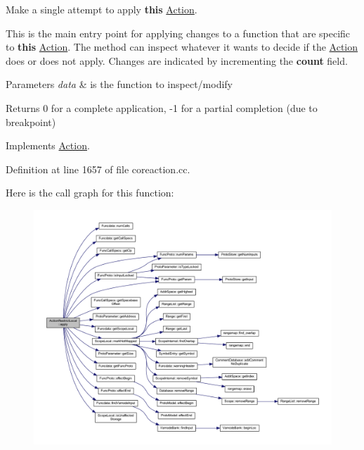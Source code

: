 Make a single attempt to apply {\bfseries{this}} \mbox{\hyperlink{class_action}{Action}}. 

This is the main entry point for applying changes to a function that are specific to {\bfseries{this}} \mbox{\hyperlink{class_action}{Action}}. The method can inspect whatever it wants to decide if the \mbox{\hyperlink{class_action}{Action}} does or does not apply. Changes are indicated by incrementing the {\bfseries{count}} field. 
\begin{DoxyParams}{Parameters}
{\em data} & is the function to inspect/modify \\
\hline
\end{DoxyParams}
\begin{DoxyReturn}{Returns}
0 for a complete application, -\/1 for a partial completion (due to breakpoint) 
\end{DoxyReturn}


Implements \mbox{\hyperlink{class_action_aac1c3999d6c685b15f5d9765a4d04173}{Action}}.



Definition at line 1657 of file coreaction.\+cc.

Here is the call graph for this function\+:
\nopagebreak
\begin{figure}[H]
\begin{center}
\leavevmode
\includegraphics[width=350pt]{class_action_restrict_local_acd58fcc24c2a2c8f7dc0d07e3d2c9cfc_cgraph}
\end{center}
\end{figure}
\mbox{\label{class_action_restrict_local_a8e1551beb973dfdb3e8bede8903f9607}} 
